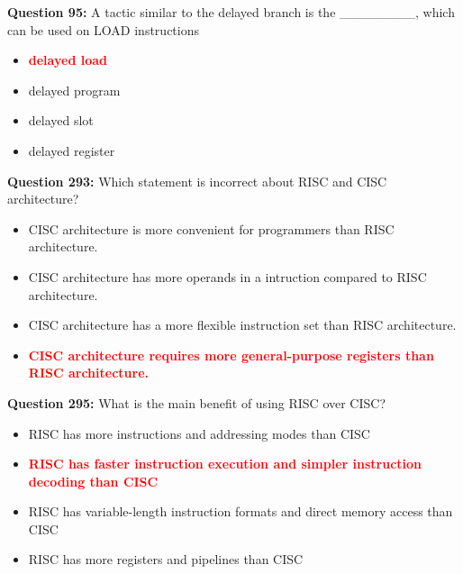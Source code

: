 \documentclass[12pt,a4paper]{article}
\begin{document}
\vspace{0.5cm}

\textbf{Question 95:} A tactic similar to the delayed branch is the ________, which can be used on LOAD instructions

\begin{itemize}
    \item[\textbf{A.}] \textcolor{red}{\textbf{delayed load}}
    \item[\textbf{B.}] delayed program
    \item[\textbf{C.}] delayed slot
    \item[\textbf{D.}] delayed register
\end{itemize}

\vspace{0.5cm}

\textbf{Question 293:} Which statement is incorrect about RISC and CISC architecture?

\begin{itemize}
    \item[\textbf{A.}] CISC architecture is more convenient for programmers than RISC architecture.
    \item[\textbf{B.}] CISC architecture has more operands in a intruction compared to RISC architecture.
    \item[\textbf{C.}] CISC architecture has a more flexible instruction set than RISC architecture.
    \item[\textbf{D.}] \textcolor{red}{\textbf{CISC architecture requires more general-purpose registers than RISC architecture.}}
\end{itemize}

\vspace{0.5cm}

\textbf{Question 295:} What is the main benefit of using RISC over CISC?

\begin{itemize}
    \item[\textbf{A.}] RISC has more instructions and addressing modes than CISC
    \item[\textbf{B.}] \textcolor{red}{\textbf{RISC has faster instruction execution and simpler instruction decoding than CISC}}
    \item[\textbf{C.}] RISC has variable-length instruction formats and direct memory access than CISC
    \item[\textbf{D.}] RISC has more registers and pipelines than CISC
\end{itemize}
\end{document}
